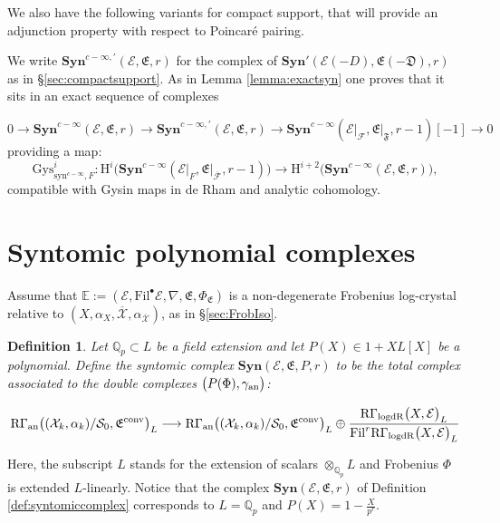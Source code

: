 \documentclass[asterisque,english]{smfart}
\newtheorem{definition}{Definition}[]
\begin{document}
We also have the following variants for compact support, that will provide an adjunction property with respect to Poincar\'e pairing. 

We write $\mathbf{Syn}^{c-\infty,'}(\mathcal{E},\mathfrak{E},r)$ for the complex of $\mathbf{Syn}'(\mathcal{E}(-D),\mathfrak{E}(-\mathfrak{D}),r)$ as in \S \ref{sec:compactsupport}. As in Lemma \ref{lemma:exactsyn} one proves that it sits in an exact sequence of complexes 

$$0\to \mathbf{Syn}^{c-\infty}(\mathcal{E},\mathfrak{E},r) \to\mathbf{Syn}^{c-\infty,'}(\mathcal{E},\mathfrak{E},r) \to\mathbf{Syn}^{c-\infty}(\mathcal{E}\vert_{\mathcal{F}},\mathfrak{E}\vert_{\mathfrak{F}},r-1)[-1]  \to 0$$providing a map:
$$\mathrm{Gys}_{\mathrm{syn}^{c-\infty},F}^i\colon \mathrm{H}^i\bigl(\mathbf{Syn}^{c-\infty}(\mathcal{E}\vert_F,\mathfrak{E}\vert_{\mathcal{\overline{F}}},r-1) \bigr) \longrightarrow \mathrm{H}^{i+2}\bigl(\mathbf{Syn}^{c-\infty}(\mathcal{E},\mathfrak{E},r)\bigr),$$compatible with Gysin maps in de Rham and analytic cohomology.

\section{Syntomic polynomial complexes}\label{S PolyCmpl}

Assume that $\mathbb{E}:=\left( \mathcal{E},\mathrm{Fil}^{\bullet }\mathcal{E
},\nabla ,\mathfrak{E},\Phi _{\mathfrak{E}}\right) $ is a non-degenerate
Frobenius log-crystal relative to $\left( X,\alpha _{X},\overline{\mathcal{X}
},\alpha _{\overline{\mathcal{X}}}\right) $, as in \S \ref{sec:FrobIso}. 


\begin{definition}\label{def:synpol}
Let $\mathbb{Q}_p\subset L$ be a field extension and let $P(X)\in 1+XL[X] $ be a polynomial. Define the syntomic complex  $\mathbf{Syn}(\mathcal{E},\mathfrak{E},P,r)$ to be the total complex associated to the double complexes $\bigl(P(\Phi),\gamma_{\rm an}\bigr)$:

$$\mathrm{R}\Gamma_{\mathrm{an}}\bigl((\mathcal{X}_k,\alpha_k)/\mathcal{S}_0,\mathfrak{E}^{\rm conv}\bigr)_L \longrightarrow \mathrm{R}\Gamma_{\mathrm{an}}\bigl((\mathcal{X}_k,\alpha_k)/\mathcal{S}_0,\mathfrak{E}^{\rm conv}\bigr)_L \oplus \frac{ \mathrm{R}\Gamma_{\mathrm{logdR}}\bigl(X, \mathcal{E}\bigr)_L }{\mathrm{Fil}^r \mathrm{R}\Gamma_{\mathrm{logdR}}\bigl(X, \mathcal{E}\bigr)_L}$$
\end{definition}

Here, the subscript $L$ stands for the extension of scalars $\otimes_{\mathbb{Q}_p} L$ and Frobenius $\Phi$ is extended $L$-linearly. Notice that the complex $\mathbf{Syn}(\mathcal{E},\mathfrak{E},r)$ of  Definition \ref{def:syntomiccomplex} corresponds to $L=\mathbb{Q}_p$ and $P(X)=1- \frac{X}{p^r}$.
\end{document}
